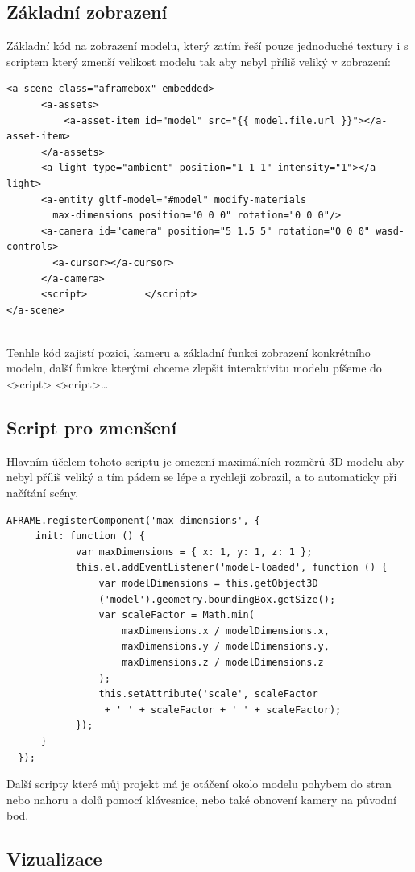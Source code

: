 \documentclass[12pt, a4paper,
oneside,      %
openright
]{report}
\begin{document}
\subsection[Základní zobrazení]{Základní zobrazení}
Základní kód na zobrazení modelu, který zatím řeší pouze jednoduché textury i s scriptem který zmenší velikost modelu tak aby nebyl příliš veliký v zobrazení:
\begin{lstlisting}
<a-scene class="aframebox" embedded>
      <a-assets>
          <a-asset-item id="model" src="{{ model.file.url }}"></a-asset-item>
      </a-assets>
      <a-light type="ambient" position="1 1 1" intensity="1"></a-light>
      <a-entity gltf-model="#model" modify-materials 
      	max-dimensions position="0 0 0" rotation="0 0 0"/>
      <a-camera id="camera" position="5 1.5 5" rotation="0 0 0" wasd-controls>
      	<a-cursor></a-cursor>
      </a-camera>
      <script>          </script>
</a-scene>
                  
\end{lstlisting}
Tenhle kód zajistí pozici, kameru a základní funkci zobrazení konkrétního modelu, další funkce kterými chceme zlepšit interaktivitu modelu píšeme do <script>   <script>\dots
\newpage
\subsection[Script pro zmenšení]{Script pro zmenšení}
Hlavním účelem tohoto scriptu je omezení maximálních rozměrů 3D modelu aby nebyl příliš veliký a tím pádem se lépe a rychleji zobrazil, a to automaticky při načítání scény.
\begin{lstlisting}
AFRAME.registerComponent('max-dimensions', {
   	 init: function () {
        	var maxDimensions = { x: 1, y: 1, z: 1 };
        	this.el.addEventListener('model-loaded', function () {
        		var modelDimensions = this.getObject3D
        		('model').geometry.boundingBox.getSize();
        		var scaleFactor = Math.min(
        			maxDimensions.x / modelDimensions.x,
        			maxDimensions.y / modelDimensions.y,
       				maxDimensions.z / modelDimensions.z
        		);
        		this.setAttribute('scale', scaleFactor
        		 + ' ' + scaleFactor + ' ' + scaleFactor);
        	});
   	  }
  });
\end{lstlisting}
Další scripty které můj projekt má je otáčení okolo modelu pohybem do stran nebo nahoru a dolů pomocí klávesnice, nebo také obnovení kamery na původní bod.
\subsection[Vizualizace]{Vizualizace}
\end{document}
